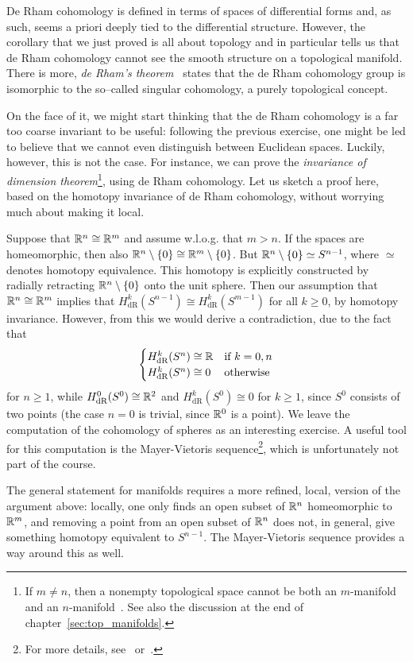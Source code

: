 \begin{remark}\label{rmk:ch_topology_domain_invariance}
	De Rham cohomology is defined in terms of spaces of differential forms and, as such, seems a priori deeply tied to the differential structure. However, the corollary that we just proved is all about topology and in particular tells us that de Rham cohomology cannot see the smooth structure on a topological manifold.
	There is more, \emph{de Rham's theorem}~\cite[Theorem 18.14]{book:lee} states that the de Rham cohomology group is isomorphic to the so--called singular cohomology, a purely topological concept.

	On the face of it, we might start thinking that the de Rham cohomology is a far too coarse invariant to be useful: following the previous exercise, one might be led to believe that we cannot even distinguish between Euclidean spaces. Luckily, however, this is not the case.
	For instance, we can prove the \emph{invariance of dimension theorem}\footnote{If $m\neq n$, then a nonempty topological space cannot be both an $m$-manifold and an $n$-manifold~\cite[Problem 13-3]{book:lee:topology}. See also the discussion at the end of chapter~\ref{sec:top_manifolds}.}, using de Rham cohomology. Let us sketch a proof here, based on the homotopy invariance of de Rham cohomology, without worrying much about making it local.

	Suppose that $\mathbb{R}^n\cong\mathbb{R}^m$ and assume w.l.o.g. that $m>n$. If the spaces are homeomorphic, then also $\mathbb{R}^n\setminus\{0\}\cong\mathbb{R}^m\setminus\{0\}$. But $\mathbb{R}^n\setminus\{0\}\simeq S^{n-1}$, where $\simeq$ denotes homotopy equivalence. This homotopy is explicitly constructed by radially retracting $\mathbb{R}^n\setminus\{0\}$ onto the unit sphere. Then our assumption that $\mathbb{R}^n\cong\mathbb{R}^m$ implies that $H^k_{\mathrm{dR}}(S^{n-1})\cong H^k_{\mathrm{dR}}(S^{m-1})$ for all $k\geq 0$,
	by homotopy invariance. However, from this we would derive a contradiction, due to the fact that
	\begin{equation}
		\begin{cases}
			H_{\mathrm{dR}}^k(S^n)\cong\mathbb{R} & \mbox{if }k=0,n  \\
			H_{\mathrm{dR}}^k(S^n)\cong 0 & \mbox{otherwise}
		\end{cases}
	\end{equation}
	for $n\geq1$, while $H^0_{\mathrm{dR}}(S^0)\cong\mathbb{R}^2$ and $H^k_{\mathrm{dR}}(S^0)\cong 0$ for $k\geq1$, since $S^0$ consists of two points (the case $n=0$ is trivial, since $\mathbb{R}^0$ is a point).
	We leave the computation of the cohomology of spheres as an interesting exercise. A useful tool for this computation is the Mayer-Vietoris sequence\footnote{For more details, see~\cite[Chapter 17.3]{book:lee} or~\cite[Chapter 26]{book:tu}.}, which is unfortunately not part of the course.

	The general statement for manifolds requires a more refined, local, version of the argument above: locally, one only finds an open subset of $\mathbb{R}^n$ homeomorphic to $\mathbb{R}^m$, and removing a point from an open subset of $\mathbb{R}^n$ does not, in general, give something homotopy equivalent to $S^{n-1}$. The Mayer-Vietoris sequence provides a way around this as well.
\end{remark}

